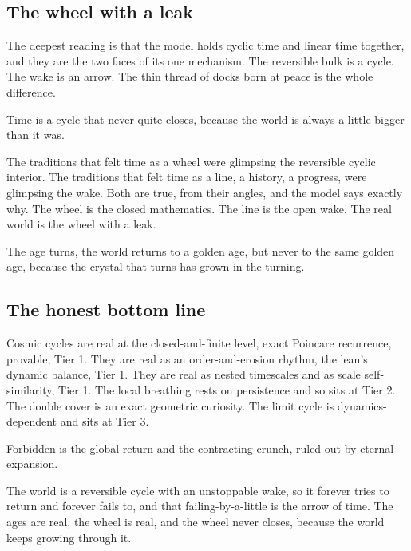\subsection{The wheel with a leak}

The deepest reading is that the model holds cyclic time and linear time together, and they are the two faces of its one mechanism. The reversible bulk is a cycle. The wake is an arrow. The thin thread of docks born at peace is the whole difference.

\begin{principle}
Time is a cycle that never quite closes, because the world is always a little bigger than it was.
\end{principle}

The traditions that felt time as a wheel were glimpsing the reversible cyclic interior. The traditions that felt time as a line, a history, a progress, were glimpsing the wake. Both are true, from their angles, and the model says exactly why. The wheel is the closed mathematics. The line is the open wake. The real world is the wheel with a leak.

\begin{principle}
The age turns, the world returns to a golden age, but never to the same golden age, because the crystal that turns has grown in the turning.
\end{principle}

\subsection{The honest bottom line}

Cosmic cycles are real at the closed-and-finite level, exact Poincare recurrence, provable, Tier 1. They are real as an order-and-erosion rhythm, the lean's dynamic balance, Tier 1. They are real as nested timescales and as scale self-similarity, Tier 1. The local breathing rests on persistence and so sits at Tier 2. The double cover is an exact geometric curiosity. The limit cycle is dynamics-dependent and sits at Tier 3.

Forbidden is the global return and the contracting crunch, ruled out by eternal expansion.

\begin{result}
The world is a reversible cycle with an unstoppable wake, so it forever tries to return and forever fails to, and that failing-by-a-little is the arrow of time. The ages are real, the wheel is real, and the wheel never closes, because the world keeps growing through it.
\end{result}
